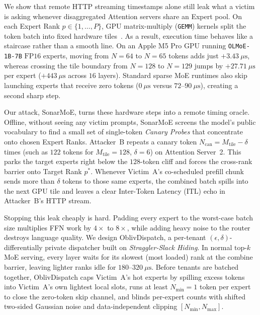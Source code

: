 \documentclass[11pt,a4paper]{article}
\renewcommand{\_}{\textunderscore\allowbreak}
\def\SM{SonarMoE}%
\def\OD{OblivDispatch}%
\theoremstyle{definition}
\theoremstyle{remark}
\newcommand{\SM}{\textsc{SonarMoE}}
\newcommand{\OD}{\textsc{OblivDispatch}}
\begin{document}
We show that remote HTTP streaming timestamps alone still leak what a victim is asking whenever disaggregated Attention servers share an Expert pool. On each Expert Rank $p \in \{1, \dots, P\}$, GPU matrix-multiply (\texttt{GEMM}) kernels split the token batch into fixed hardware tiles~\cite{gale2023megablocks,tan2025gpugemmcliff}. As a result, execution time behaves like a staircase rather than a smooth line. On an Apple M5 Pro GPU running \texttt{OLMoE-1B-7B} $\mathrm{FP16}$ experts, moving from $N=64$ to $N=65$ tokens adds just $+3.43~\mu\mathrm{s}$, whereas crossing the tile boundary from $N=128$ to $N=129$ jumps by $+27.71~\mu\mathrm{s}$ per expert ($+443~\mu\mathrm{s}$ across $16$ layers). Standard sparse MoE runtimes also skip launching experts that receive zero tokens ($0~\mu\mathrm{s}$ versus $72$--$90~\mu\mathrm{s}$), creating a second sharp step.

Our attack, \SM{}, turns these hardware steps into a remote timing oracle. Offline, without seeing any victim prompts, \SM{} screens the model's public vocabulary to find a small set of single-token \emph{Canary Probes} that concentrate onto chosen Expert Ranks. Attacker~B repeats a canary token $N_{\mathrm{can}} = M_{\mathrm{tile}} - \delta$ times (such as $122$ tokens for $M_{\mathrm{tile}} = 128$, $\delta = 6$) on Attention Server~2. This parks the target experts right below the $128$-token cliff and forces the cross-rank barrier onto Target Rank $p^*$. Whenever Victim~A's co-scheduled prefill chunk sends more than $\delta$ tokens to those same experts, the combined batch spills into the next GPU tile and leaves a clear Inter-Token Latency ($\mathrm{ITL}$) echo in Attacker~B's HTTP stream.

Stopping this leak cheaply is hard. Padding every expert to the worst-case batch size multiplies FFN work by $4\times$ to $8\times$, while adding heavy noise to the router destroys language quality. We design \OD{}, a per-tenant $(\epsilon, \delta)$-differentially private dispatcher built on \emph{Straggler-Slack Hiding}. In normal $\text{top-}k$ MoE serving, every layer waits for its slowest (most loaded) rank at the combine barrier, leaving lighter ranks idle for $180$--$320~\mu\mathrm{s}$. Before tenants are batched together, \OD{} caps Victim~A's hot experts by spilling excess tokens into Victim~A's own lightest local slots, runs at least $N_{\min} = 1$ token per expert to close the zero-token skip channel, and blinds per-expert counts with shifted two-sided Gaussian noise and data-independent clipping $[N_{\min}, N_{\max}]$.
\end{document}
